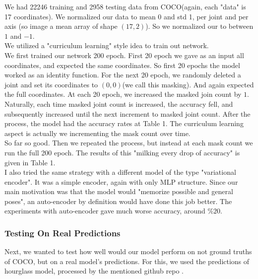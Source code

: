 \documentclass[titlepage, a4paper, 14pt]{extarticle} %
\begin{document}
We had 22246 training and 2958 testing data from COCO(again, each "data" is 17 coordinates). We normalized our data to mean 0 and std 1, per joint and per axis (so image a mean array of shape $(17,2)$). So we normalized our to between $1$ and $-1$. \\

We utilized a "curriculum learning" style idea to train out network.\\

We first trained our network 200 epoch. First 20 epoch we gave as an input all coordinates, and expected the same coordinates. So first 20 epochs the model worked as an identity function. For the next 20 epoch, we randomly deleted a joint and set its coordinates to $(0,0)$(we call this masking). And again expected the full coordinates. At each 20 epoch, we increased the masked join count by $1$. \\

Naturally, each time masked joint count is increased, the accuracy fell, and subsequently increased until the next increment to masked joint count. After the process, the model had the accuracy rates at Table 1. The curriculum learning aspect is actually we incrementing the mask count over time.\\

So far so good. Then we repeated the process, but instead at each mask count we run the full 200 epoch. The results of this "milking every drop of accuracy" is given in Table 1. \\

I also tried the same strategy with a different model of the type "variational encoder". It was a simple encoder, again with only MLP structure. Since our main motivation was that the model would "memorize possible and general poses", an auto-encoder by definition would have done this job better. The experiments with auto-encoder gave much worse accuracy, around $\%20$.



\subsubsection{Testing On Real Predictions} \label{implementation}

Next, we wanted to test how well would our model perform on not ground truths of COCO, but on a real model's predictions. For this, we used the predictions of hourglass model, processed by the mentioned github repo\cite{py-pose} . \\
\end{document}
